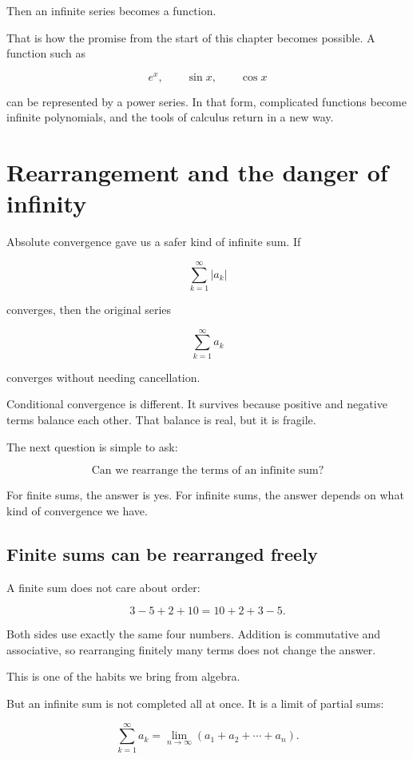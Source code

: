 Then an infinite series becomes a function.

That is how the promise from the start of this chapter becomes possible.  A function such
as

\[
e^x,
\qquad
\sin x,
\qquad
\cos x
\]

can be represented by a power series.  In that form, complicated functions become
infinite polynomials, and the tools of calculus return in a new way.
\section{Rearrangement and the danger of infinity}
\label{sec:rearrangement-danger-infinity}

Absolute convergence gave us a safer kind of infinite sum.  If

\[
\sum_{k=1}^{\infty}|a_k|
\]

converges, then the original series

\[
\sum_{k=1}^{\infty}a_k
\]

converges without needing cancellation.

Conditional convergence is different.  It survives because positive and negative terms
balance each other.  That balance is real, but it is fragile.

The next question is simple to ask:

\[
\boxed{
\text{Can we rearrange the terms of an infinite sum?}
}
\]

For finite sums, the answer is yes.  For infinite sums, the answer depends on what kind
of convergence we have.

\subsection{Finite sums can be rearranged freely}
\label{subsec:finite-sums-rearranged-freely}

A finite sum does not care about order:

\[
3-5+2+10=10+2+3-5.
\]

Both sides use exactly the same four numbers.  Addition is commutative and associative,
so rearranging finitely many terms does not change the answer.

This is one of the habits we bring from algebra.

But an infinite sum is not completed all at once.  It is a limit of partial sums:

\[
\sum_{k=1}^{\infty}a_k
=
\lim_{n\to\infty}(a_1+a_2+\cdots+a_n).
\]

